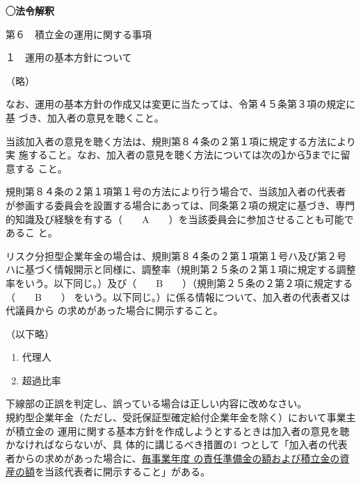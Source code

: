 \begin{fillblank}[年金1 2023 問題1(1)ウ、エ]
  \noindent \textbf{◯法令解釈}
  \begin{lawstructure}
    \begin{lawarticle}{}{}
      第６　積立金の運用に関する事項

      １　運用の基本方針について

      （略）

      なお、運用の基本方針の作成又は変更に当たっては、令第４５条第３項の規定に基
      づき、加入者の意見を聴くこと。

      当該加入者の意見を聴く方法は、規則第８４条の２第１項に規定する方法により実
      施すること。なお、加入者の意見を聴く方法については次の\textcircled{1}から\textcircled{5}までに留意する
      こと。

      規則第８４条の２第１項第１号の方法により行う場合で、当該加入者の代表者
      が参画する委員会を設置する場合にあっては、同条第２項の規定に基づき、専門
      的知識及び経験を有する（　　A　　）を当該委員会に参加させることも可能であるこ
      と。



      リスク分担型企業年金の場合は、規則第８４条の２第１項第１号ハ及び第２号
      ハに基づく情報開示と同様に、調整率（規則第２５条の２第１項に規定する調整
      率をいう。以下同じ。）及び（　　B　　）（規則第２５条の２第２項に規定する（　　B　　）
      をいう。以下同じ。）に係る情報について、加入者の代表者又は代議員から
      の求めがあった場合に開示すること。

      （以下略）
    \end{lawarticle}
  \end{lawstructure}
\end{fillblank}

\begin{answerbox}
  \begin{enumerate}[A: ]
    \item 代理人
    \item 超過比率
  \end{enumerate}
\end{answerbox}

\begin{truefalse}[年金1 2020 問題1(3)\textcircled{1}]
  下線部の正誤を判定し、誤っている場合は正しい内容に改めなさい。
  \\

  規約型企業年金（ただし、受託保証型確定給付企業年金を除く）において事業主が積立金の
運用に関する基本方針を作成しようとするときは加入者の意見を聴かなければならないが、具
体的に講じるべき措置の1 つとして「加入者の代表者からの求めがあった場合に、\underline{毎事業年度
の責任準備金の額および積立金の資産の額}を当該代表者に開示すること」がある。
\end{truefalse}

